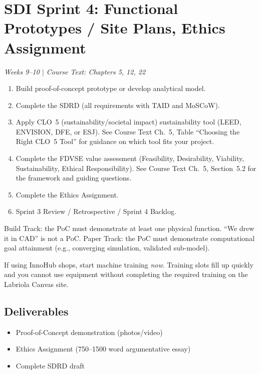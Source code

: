 \section{SDI Sprint 4: Functional Prototypes / Site Plans, Ethics Assignment}
\textit{Weeks 9--10 $|$ Course Text: Chapters 5, 12, 22}

\begin{priorities}
\begin{enumerate}[nosep]
\item Build proof-of-concept prototype or develop analytical model.
\item Complete the SDRD (all requirements with TAID and MoSCoW).
\item Apply CLO~5 (sustainability/societal impact) sustainability tool (LEED, ENVISION, DFE, or ESJ). See Course Text Ch.~5, Table ``Choosing the Right CLO~5 Tool'' for guidance on which tool fits your project.
\item Complete the FDVSE value assessment (Feasibility, Desirability, Viability, Sustainability, Ethical Responsibility). See Course Text Ch.~5, Section~5.2 for the framework and guiding questions.
\item Complete the Ethics Assignment.
\item Sprint 3 Review / Retrospective / Sprint 4 Backlog.
\end{enumerate}
\end{priorities}

\begin{warnbox}
Build Track: the PoC must demonstrate at least one physical function. ``We drew it in CAD'' is not a PoC. Paper Track: the PoC must demonstrate computational goal attainment (e.g., converging simulation, validated sub-model).
\end{warnbox}

\begin{protip}
If using InnoHub shops, start machine training \emph{now}. Training slots fill up quickly and you cannot use equipment without completing the required training on the Labriola Canvas site.
\end{protip}

\subsection{Deliverables}
\begin{itemize}[nosep,leftmargin=1.5em]
\item Proof-of-Concept demonstration (photos/video)
\item Ethics Assignment (750--1500 word argumentative essay)
\item Complete SDRD draft
\end{itemize}


